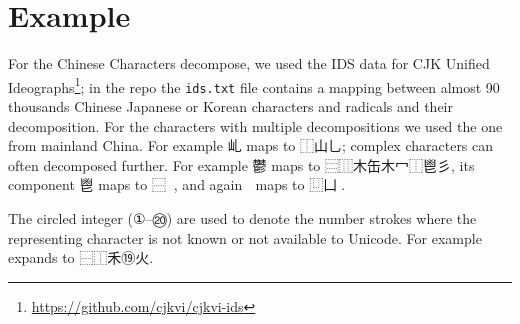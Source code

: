 \documentclass[11pt]{extarticle}
\begin{document}
\section{Example}

For the Chinese Characters decompose, we used the IDS data for CJK Unified Ideographs\footnote{\url{https://github.com/cjkvi/cjkvi-ids}}; in the repo the \texttt{ids.txt} file contains a mapping between almost 90 thousands Chinese Japanese or Korean characters and radicals and their decomposition.  For the characters with multiple decompositions we used the one from mainland China.  For example 乢 maps to ⿰山乚; complex characters can often decomposed further.  For example 鬱 maps to ⿳⿲木缶木冖⿰鬯彡, its component 鬯 maps to ⿱𠚍匕, and again 𠚍 maps to ⿶凵𠂭.

The circled integer (①--⑳) are used to denote the number strokes where the representing character is not known or not available to Unicode. For example 𬋢 expands to ⿱⿰禾⑲火.
\end{document}
